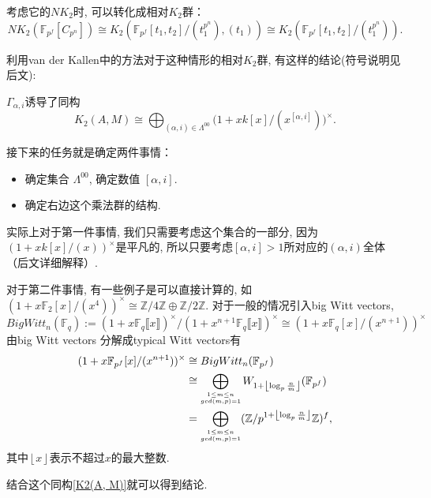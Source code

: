 考虑它的$NK_2$时, 可以{\color{blue}转化成相对$K_2$群}：
\[NK_2(\mathbb{F}_{p^f}[C_{p^n}]) \cong K_2(\mathbb{F}_{p^f}[t_1, t_2]/(t_1^{p^n}), (t_1))\cong K_2(\mathbb{F}_{p^f}[t_1, t_2]/(t_1^{p^n})). \]

利用van der Kallen\cite{MR86f:18017}中的方法对于这种情形的相对$K_2$群, 有这样的结论(符号说明见后文):
\begin{theorem*}
	$\Gamma_{\alpha, i}$诱导了{\color{red}同构}
\[ K_2(A, M)\cong \bigoplus_{(\alpha, i)\in\Lambda^{00}}\big(1+xk[x]/(x^{[\alpha, i]})\big)^{\times}. \]
\end{theorem*}

接下来的任务就是确定两件事情：
\begin{itemize}
	\item 确定集合{\color{blue} $\Lambda^{00}$}, 确定数值{\color{blue} $[\alpha, i]$}. 
	\item 确定右边这个{\color{blue}乘法群}的结构. 
\end{itemize}
实际上对于第一件事情, 我们只需要考虑这个集合的一部分, 因为$(1+xk[x]/(x))^{\times}$是平凡的, 所以只要考虑$[\alpha, i]>1$所对应的$(\alpha, i)$全体（后文详细解释）. 

对于第二件事情, 有一些例子是可以直接计算的, 如$(1+x\mathbb{F}_2[x]/(x^{4}))^{\times}\cong \mathbb{Z}/4 \mathbb{Z} \oplus\mathbb{Z}/2 \mathbb{Z}$. 对于一般的情况引入big Witt vectors, 
\[BigWitt_n(\mathbb{F}_q):=(1+x \mathbb{F}_q\llbracket x\rrbracket )^{\times}/(1+x^{n+1} \mathbb{F}_q\llbracket x\rrbracket )^{\times} \cong (1+x\mathbb{F}_q[x]/(x^{n+1}))^{\times}\]
由big Witt vectors{\color{blue} 分解成typical Witt vectors}有
\begin{align*}
(1+x\mathbb{F}_{p^f}[x]/(x^{n+1}))^{\times}&\cong BigWitt_n(\mathbb{F}_{p^f}) \\
&\cong \bigoplus_{\scriptsize\substack{1\leq m\leq n \\ gcd(m, p)=1}}W_{1+ \left \lfloor\log_p \frac{n}{m}  \right \rfloor}(\mathbb{F}_{p^f}) \\
& = \bigoplus_{\scriptsize\substack{1\leq m\leq n \\ gcd(m, p)=1}}(\mathbb{Z}/p^{1+ \left \lfloor\log_p \frac{n}{m}  \right \rfloor}\mathbb{Z})^f, 
\end{align*}
其中$ \left \lfloor x \right \rfloor$表示不超过$x$的最大整数. 

结合这个同构\ref{K2(A, M)}就可以得到结论. 

